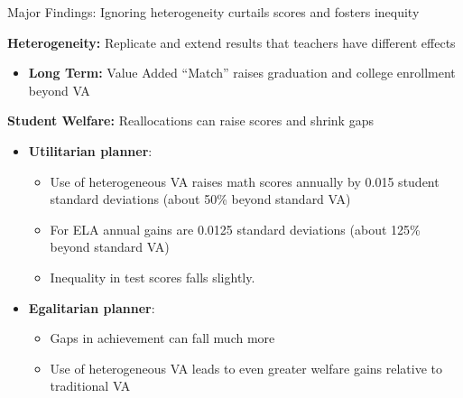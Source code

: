 \documentclass[t,aspectratio=169,11pt]{beamer}
\begin{document}

\begin{frame}{Major Findings: Ignoring heterogeneity curtails scores and fosters inequity}

    \vfill        
    \begin{wideitemize}
        \item {\textbf{Heterogeneity:}} Replicate and extend results that teachers have different effects
        {\tiny \color{gray}\citep{lockwood2009,condie2014teacher,bates2022teacher}}
            \begin{itemize}
                \item<2-> {\textbf{Long Term:}} Value Added ``Match'' raises graduation and college enrollment beyond VA
            \end{itemize}
        
        \item<3-> {\textbf{Student Welfare:}} Reallocations can raise scores and shrink gaps 
            \begin{itemize}
                \item<4-> \textbf{Utilitarian planner}:
                \begin{itemize}
                    \item<5-> Use of heterogeneous VA raises math scores annually by 0.015 student standard deviations (about 50\% beyond standard VA) 
                     \item<6-> For ELA annual gains are 0.0125 standard deviations (about 125\% beyond standard VA)
                \item<7-> Inequality in test scores falls slightly.
                \end{itemize}
               
                \item<8->\textbf{Egalitarian planner}:
                \begin{itemize}
                    \item<9-> Gaps in achievement can fall much more
                    \item<10-> Use of heterogeneous VA leads to even greater welfare gains relative to traditional VA 
                

\end{itemize}
\end{itemize}
\end{wideitemize}
\end{frame}
\end{document}
